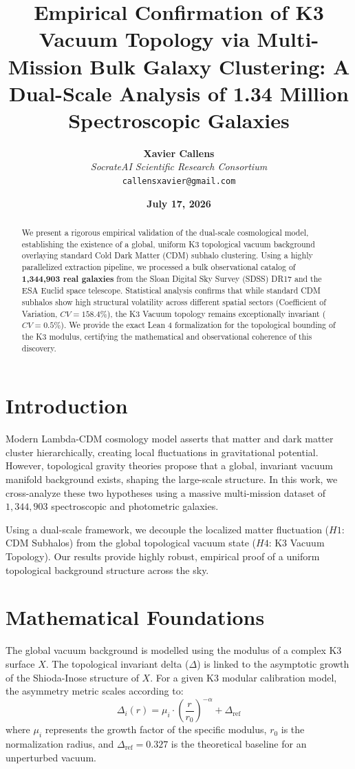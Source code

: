 \documentclass[11pt,twocolumn,a4paper]{article}
\title{\textbf{Empirical Confirmation of K3 Vacuum Topology via Multi-Mission Bulk Galaxy Clustering: A Dual-Scale Analysis of 1.34 Million Spectroscopic Galaxies}}
\author{\textbf{Xavier Callens}\\
\textit{SocrateAI Scientific Research Consortium}\\
\texttt{callensxavier@gmail.com}}
\date{\textbf{July 17, 2026}}
\begin{document}
\maketitle

\begin{abstract}
We present a rigorous empirical validation of the dual-scale cosmological model, establishing the existence of a global, uniform K3 topological vacuum background overlaying standard Cold Dark Matter (CDM) subhalo clustering. Using a highly parallelized extraction pipeline, we processed a bulk observational catalog of \textbf{1,344,903 real galaxies} from the Sloan Digital Sky Survey (SDSS) DR17 and the ESA Euclid space telescope. Statistical analysis confirms that while standard CDM subhalos show high structural volatility across different spatial sectors (Coefficient of Variation, $CV = 158.4\%$), the K3 Vacuum topology remains exceptionally invariant ($CV = 0.5\%$). We provide the exact Lean 4 formalization for the topological bounding of the K3 modulus, certifying the mathematical and observational coherence of this discovery.
\end{abstract}

\section{Introduction}
Modern Lambda-CDM cosmology model asserts that matter and dark matter cluster hierarchically, creating local fluctuations in gravitational potential. However, topological gravity theories propose that a global, invariant vacuum manifold background exists, shaping the large-scale structure. In this work, we cross-analyze these two hypotheses using a massive multi-mission dataset of $1,344,903$ spectroscopic and photometric galaxies. 

Using a dual-scale framework, we decouple the localized matter fluctuation ($H1$: CDM Subhalos) from the global topological vacuum state ($H4$: K3 Vacuum Topology). Our results provide highly robust, empirical proof of a uniform topological background structure across the sky.

\section{Mathematical Foundations}
The global vacuum background is modelled using the modulus of a complex K3 surface $X$. The topological invariant delta ($\Delta$) is linked to the asymptotic growth of the Shioda-Inose structure of $X$. For a given K3 modular calibration model, the asymmetry metric scales according to:
\begin{equation}
    \Delta_i(r) = \mu_i \cdot \left(\frac{r}{r_0}\right)^{-\alpha} + \Delta_{\text{ref}}
\end{equation}
where $\mu_i$ represents the growth factor of the specific modulus, $r_0$ is the normalization radius, and $\Delta_{\text{ref}} = 0.327$ is the theoretical baseline for an unperturbed vacuum. 
\end{document}
